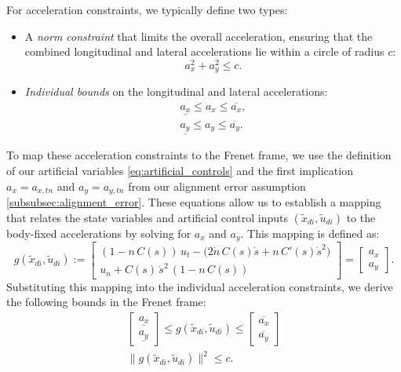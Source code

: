 For acceleration constraints, we typically define two types:
\begin{itemize}
	\item A \emph{norm constraint} that limits the overall acceleration, ensuring that the combined longitudinal and lateral accelerations lie within a circle of radius \(c\):
	      \begin{equation}
		      a_x^2 + a_y^2 \leq c.
	      \end{equation}
	\item \emph{Individual bounds} on the longitudinal and lateral accelerations:
	      \begin{align}
		      \underline{a_x} \leq a_x \leq \overline{a_x}, \\
		      \underline{a_y} \leq a_y \leq \overline{a_y}.
	      \end{align}
\end{itemize}

To map these acceleration constraints to the Frenet frame, we use the definition of our artificial variables \eqref{eq:artificial_controls} and the
first implication $a_x=a_{x,tn}$ and $a_y=a_{y,tn}$ from our alignment error assumption \ref{subsubsec:alignment_error}.
These equations allow us to establish a mapping that relates the state variables and artificial control inputs \((\tilde{x}_{di}, \tilde{u}_{di})\)
to the body-fixed accelerations by solving for $a_x$ and $a_y$.
This mapping is defined as:
\begin{equation}
	\label{def:g}
	g(\tilde{x}_{di}, \tilde{u}_{di}) :=
	\begin{bmatrix}
		(1 - n\,C(s))\,u_t - \bigl(2\dot{n}\,C(s)\dot{s} + n\,C'(s)\dot{s}^2\bigr) \\
		u_n + C(s)\,\dot{s}^2\,(1 - n\,C(s))
	\end{bmatrix}
	=
	\begin{bmatrix}
		a_x \\
		a_y
	\end{bmatrix}.
\end{equation}
Substituting this mapping into the individual acceleration constraints, we derive the following bounds in the Frenet frame:
\begin{align}
	\begin{bmatrix}
		\underline{a_x} \\[2mm] \underline{a_y}
	\end{bmatrix} \leq g(\tilde{x}_{di}, \tilde{u}_{di}) \leq \begin{bmatrix}
		                                                          \overline{a_x} \\[2mm] \overline{a_y}
	                                                          \end{bmatrix} \\[2mm]
	\|g(\tilde{x}_{di}, \tilde{u}_{di})\|^2 \leq c.
\end{align}

